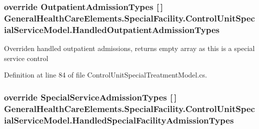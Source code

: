 \subsubsection[{\texorpdfstring{Handled\+Outpatient\+Admission\+Types}{HandledOutpatientAdmissionTypes}}]{\setlength{\rightskip}{0pt plus 5cm}override {\bf Outpatient\+Admission\+Types} \mbox{[}$\,$\mbox{]} General\+Health\+Care\+Elements.\+Special\+Facility.\+Control\+Unit\+Special\+Service\+Model.\+Handled\+Outpatient\+Admission\+Types\hspace{0.3cm}{\ttfamily [get]}}\hypertarget{class_general_health_care_elements_1_1_special_facility_1_1_control_unit_special_service_model_a666f805c7e2c9caaf5da6a5a57593b2d}{}\label{class_general_health_care_elements_1_1_special_facility_1_1_control_unit_special_service_model_a666f805c7e2c9caaf5da6a5a57593b2d}


Overriden handled outpatient admissions, returns empty array as this is a special service control 



Definition at line 84 of file Control\+Unit\+Special\+Treatment\+Model.\+cs.

\subsubsection[{\texorpdfstring{Handled\+Special\+Facility\+Admission\+Types}{HandledSpecialFacilityAdmissionTypes}}]{\setlength{\rightskip}{0pt plus 5cm}override {\bf Special\+Service\+Admission\+Types} \mbox{[}$\,$\mbox{]} General\+Health\+Care\+Elements.\+Special\+Facility.\+Control\+Unit\+Special\+Service\+Model.\+Handled\+Special\+Facility\+Admission\+Types\hspace{0.3cm}{\ttfamily [get]}}\hypertarget{class_general_health_care_elements_1_1_special_facility_1_1_control_unit_special_service_model_a0cd44adb35b7faf39ad9ea7fa1c43a5e}{}\label{class_general_health_care_elements_1_1_special_facility_1_1_control_unit_special_service_model_a0cd44adb35b7faf39ad9ea7fa1c43a5e}



